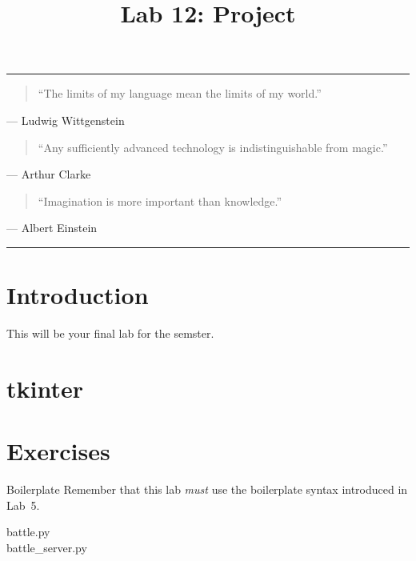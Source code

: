 \documentclass[11pt]{cselabheader}
\title{Lab 12: Project}
\begin{document}
\maketitle

\hrule
\begin{quotation}
``The limits of my language mean the limits of my world.''
\end{quotation}
\begin{flushright}
--- Ludwig Wittgenstein
\end{flushright}

\begin{quotation}
``Any sufficiently advanced technology is indistinguishable from magic.''
\end{quotation}
\begin{flushright}
--- Arthur Clarke
\end{flushright}

\begin{quotation}
``Imagination is more important than knowledge.''
\end{quotation}
\begin{flushright}
--- Albert Einstein
\end{flushright}

\hrule

\section{Introduction}
This will be your final lab for the semster.

\pagebreak

\section{tkinter}
\label{sec:tk}

\pagebreak

\section{Exercises}
\label{sec:ex}

\begin{warningbox}{Boilerplate}
  Remember that this lab \emph{must} use the
  boilerplate syntax introduced in Lab~5.
\end{warningbox}

\begin{description}
\item[battle.py]
\item[battle\_server.py]
\end{description}
\end{document}
